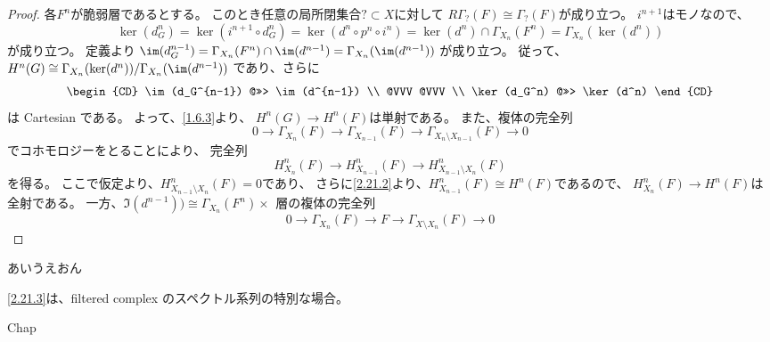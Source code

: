 \documentclass[uplatex,dvipdfmx]{jsarticle}
\begin{document}
\begin{proof}
  各\(F^n\)が脆弱層であるとする。
  このとき任意の局所閉集合\(?\subset X\)に対して
  \(R\Gamma_{?}(F)\cong \Gamma_{?}(F)\)が成り立つ。
  \(i^{n+1}\)はモノなので、
  \[
  \ker(d_G^n) = \ker(i^{n+1}\circ d_G^n) = \ker(d^n\circ p^n \circ i^n)
  = \ker(d^n)\cap \Gamma_{X_n}(F^n) = \Gamma_{X_n}(\ker(d^n))
  \]
  が成り立つ。
  定義より
  \(\im(d_G^{n-1}) = \Gamma_{X_n}(F^n)\cap \im(d^{n-1}) = \Gamma_{X_n}(\im(d^{n-1}))\)
  が成り立つ。
  従って、
  \(H^n(G) \cong \Gamma_{X_n}(\ker(d^n))/\Gamma_{X_n}(\im(d^{n-1}))\)
  であり、さらに
  \[
  \begin{CD}
    \im(d_G^{n-1}) @>>> \im(d^{n-1}) \\
    @VVV @VVV \\
    \ker(d_G^n) @>>> \ker(d^n)
  \end{CD}
  \]
  は Cartesian である。
  よって、\autoref{1.6.3}より、
  \(H^n(G) \to H^n(F)\)は単射である。
  また、複体の完全列
  \[
  0\to \Gamma_{X_n}(F) \to \Gamma_{X_{n-1}}(F) \to
  \Gamma_{X_n\setminus X_{n-1}}(F) \to 0
  \]
  でコホモロジーをとることにより、
  完全列
  \[
  H^n_{X_n}(F) \to H^n_{X_{n-1}}(F) \to H^n_{X_{n-1}\setminus X_n}(F)
  \]
  を得る。
  ここで仮定より、\(H^n_{X_{n-1}\setminus X_n}(F) = 0\)であり、
  さらに\ref{2.21.2}より、\(H^n_{X_{n-1}}(F)\cong H^n(F)\)であるので、
  \(H^n_{X_n}(F) \to H^n(F)\)は全射である。
  一方、\(\Im(d^{n-1})) \cong \Gamma_{X_n}(F^n)\times_{} \)
  層の複体の完全列
  \[
  0 \to \Gamma_{X_n}(F) \to F\to \Gamma_{X\setminus X_n}(F) \to 0
  \]

\end{proof}


あいうえおん

\begin{kansou*}
  \ref{2.21.3}は、filtered complex のスペクトル系列の特別な場合。
\end{kansou*}


\ifcsname Chap\endcsname\else
\printbibliography
\end{document}
